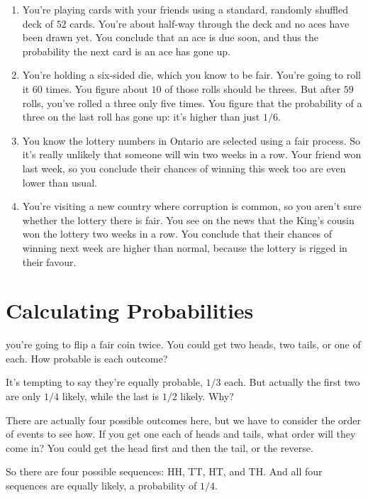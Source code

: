 \documentclass[justified]{tufte-book}
\theoremstyle{definition}
\theoremstyle{definition}
\theoremstyle{definition}
\theoremstyle{remark}
\begin{document}
\begin{enumerate}
  \begin{enumerate}
  \def\labelenumii{\alph{enumii}.}
  \item
    You're playing cards with your friends using a standard, randomly shuffled deck of \(52\) cards. You're about half-way through the deck and no aces have been drawn yet. You conclude that an ace is due soon, and thus the probability the next card is an ace has gone up.
  \item
    You're holding a six-sided die, which you know to be fair. You're going to roll it \(60\) times. You figure about \(10\) of those rolls should be threes. But after \(59\) rolls, you've rolled a three only five times. You figure that the probability of a three on the last roll has gone up: it's higher than just \(1/6\).
  \item
    You know the lottery numbers in Ontario are selected using a fair process. So it's really unlikely that someone will win two weeks in a row. Your friend won last week, so you conclude their chances of winning this week too are even lower than usual.
  \item
    You're visiting a new country where corruption is common, so you aren't sure whether the lottery there is fair. You see on the news that the King's cousin won the lottery two weeks in a row. You conclude that their chances of winning next week are higher than normal, because the lottery is rigged in their favour.
  \end{enumerate}
\end{enumerate}

\hypertarget{calculating-probabilities}{%
\chapter{Calculating Probabilities}\label{calculating-probabilities}}

 you're going to flip a fair coin twice. You could get two heads, two tails, or one of each. How probable is each outcome?

It's tempting to say they're equally probable, \(1/3\) each. But actually the first two are only \(1/4\) likely, while the last is \(1/2\) likely. Why?

There are actually four possible outcomes here, but we have to consider the order of events to see how. If you get one each of heads and tails, what order will they come in? You could get the head first and then the tail, or the reverse.

So there are four possible sequences: HH, TT, HT, and TH. And all four sequences are equally likely, a probability of \(1/4\).
\end{document}
